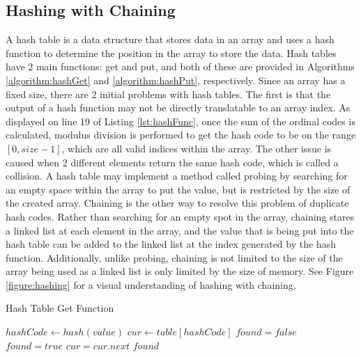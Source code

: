 \documentclass[letterpaper, 10pt,DIV=13]{scrartcl}
\numberwithin{equation}{section} %
\numberwithin{figure}{section} %
\numberwithin{table}{section} %
\begin{document}
\subsection{Hashing with Chaining}
A hash table is a data structure that stores data in an array and uses a hash function to determine the position in the array to store the data. Hash tables have 2 main functions: get and put, and both of these are provided in Algorithms \ref{algorithm:hashGet} and \ref{algorithm:hashPut}, respectively. Since an array has a fixed size, there are 2 initial problems with hash tables. The first is that the output of a hash function may not be directly translatable to an array index. As displayed on line 19 of Listing \ref{lst:hashFunc}, once the sum of the ordinal codes is calculated, modulus division is performed to get the hash code to be on the range $[0, size - 1]$, which are all valid indices within the array. The other issue is caused when 2 different elements return the same hash code, which is called a collision. A hash table may implement a method called probing by searching for an empty space within the array to put the value, but is restricted by the size of the created array. Chaining is the other way to resolve this problem of duplicate hash codes. Rather than searching for an empty spot in the array, chaining stares a linked list at each element in the array, and the value that is being put into the hash table can be added to the linked list at the index generated by the hash function. Additionally, unlike probing, chaining is not limited to the size of the array being used as a linked list is only limited by the size of memory. See Figure \ref{figure:hashing} for a visual understanding of hashing with chaining.

\begin{algorithm}
  \caption{Hash Table Get Function}
  \label{algorithm:hashGet}
  \begin{algorithmic}[1]
        \State $hashCode \gets hash(value)$ 
        \State $cur \gets table[hashCode]$ 
        \State $found = false$ 
            \State $found = true$ 
          \EndIf
          \State $cur = cur.next$ 
        \EndWhile
        \State \Return $found$
      \EndProcedure
  \end{algorithmic}
\end{algorithm}
\end{document}
